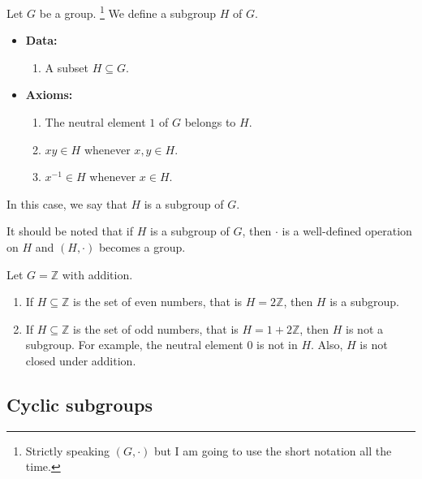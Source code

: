 \begin{definition}
Let $G$ be a group.%
\footnote{Strictly speaking $(G,\cdot)$ but I am going to use the short notation all the time.}
We define a subgroup $H$ of $G$.
\begin{itemize}
\item \textbf{Data:} 
\begin{enumerate}
\item A subset $H\subseteq G$.
\end{enumerate}
\item \textbf{Axioms:}
\begin{enumerate}
\item The neutral element $1$ of $G$ belongs to $H$.

\item $x  y\in H$ whenever $x,y\in H$.

\item $x^{-1}\in H$ whenever $x\in H$.
\end{enumerate}
\end{itemize}
In this case, we say that $H$ is a subgroup of $G$.
\end{definition}

It should be noted that if $H$ is a subgroup of $G$, then $\cdot$ is a well-defined operation on $H$ and $(H,\cdot)$ becomes a group.

\begin{examples}
Let $G =\mathbb Z$ with addition.
\begin{enumerate}
\item If $H\subseteq \mathbb Z$ is the set of even numbers, that is $H = 2\mathbb Z$, then $H$ is a subgroup.

\item If $H\subseteq \mathbb Z$ is the set of odd numbers, that is $H = 1 + 2 \mathbb Z$, then $H$ is not a subgroup.
For example, the neutral element $0$ is not in $H$.
Also, $H$ is not closed under addition.
\end{enumerate}
\end{examples}

\subsection{Cyclic subgroups}

